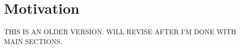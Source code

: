 %
%
\label{chapter:intro}

\setcounter{page}{1}
\pagestyle{myheadings}


\newtheorem{definition}{Definition}
\newtheorem{proposition}{Proposition}


\section{Motivation}

THIS IS AN OLDER VERSION. WILL REVISE AFTER I'M DONE WITH MAIN SECTIONS.




